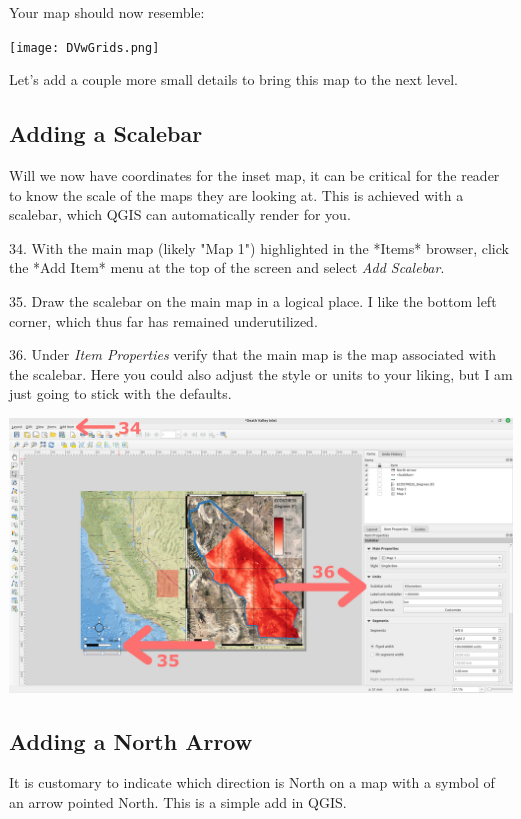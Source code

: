 \documentclass[oneside,a4paper,11pt,explicit]{book}
\begin{document}
Your map should now resemble:

\centerline{\texttt{[image: DVwGrids.png]}}


Let's add a couple more small details to bring this map to the next level.

\subsection{Adding a Scalebar}

Will we now have coordinates for the inset map, it can be critical for the reader to know the scale of the maps they are looking at. This is achieved with a scalebar, which QGIS can automatically render for you.

34. With the main map (likely "Map 1") highlighted in the *Items* browser,  click the *Add Item* menu at the top of the screen and select \textit{Add Scalebar}.

35. Draw the scalebar on the main map in a logical place. I like the bottom left corner, which thus far has remained underutilized. 

36. Under \textit{Item Properties} verify that the main map is the map associated with the scalebar. Here you could also adjust the style or units to your liking, but I am just going to stick with the defaults.

\centerline{\includegraphics[width=\textwidth]{Scalebar.png}}


\subsection{Adding a North Arrow}

It is customary to indicate which direction is North on a map with a symbol of an arrow pointed North. This is a simple add in QGIS. 
\end{document}
